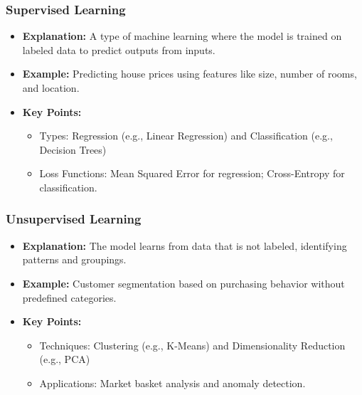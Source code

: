 \documentclass[aspectratio=169]{beamer}
\begin{document}
\begin{frame}[fragile]
    \frametitle{Supervised Learning}
    \begin{itemize}
        \item \textbf{Explanation:} A type of machine learning where the model is trained on labeled data to predict outputs from inputs.
        \item \textbf{Example:} Predicting house prices using features like size, number of rooms, and location.
        \item \textbf{Key Points:}
        \begin{itemize}
            \item Types: Regression (e.g., Linear Regression) and Classification (e.g., Decision Trees)
            \item Loss Functions: Mean Squared Error for regression; Cross-Entropy for classification.
        \end{itemize}
    \end{itemize}
\end{frame}

\begin{frame}[fragile]
    \frametitle{Unsupervised Learning}
    \begin{itemize}
        \item \textbf{Explanation:} The model learns from data that is not labeled, identifying patterns and groupings.
        \item \textbf{Example:} Customer segmentation based on purchasing behavior without predefined categories.
        \item \textbf{Key Points:}
        \begin{itemize}
            \item Techniques: Clustering (e.g., K-Means) and Dimensionality Reduction (e.g., PCA)
            \item Applications: Market basket analysis and anomaly detection.
        \end{itemize}
    \end{itemize}
\end{frame}
\end{document}
